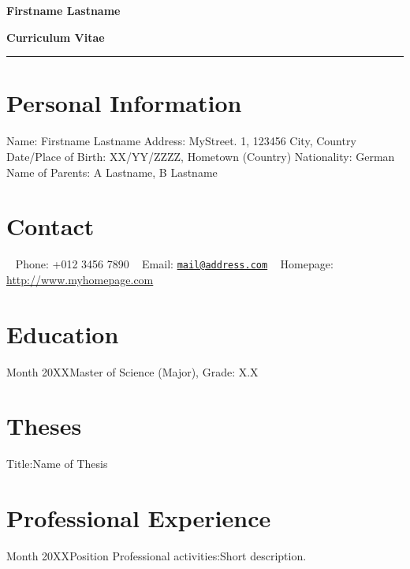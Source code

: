 \documentclass{tiny_cv}
\def\firstname{Firstname }
\def\familyname{Lastname}
\begin{document}
\begin{center}
\fontsize{30}{40}\selectfont \textbf{\firstname \familyname}
\end{center}

\begin{center}
\LARGE \textbf{Curriculum Vitae}
\end{center}


\noindent\rule{\textwidth}{1.2pt}

\section{Personal Information}
\identifyinginformationsubsection
{Name: \firstname \familyname}
{Address: MyStreet. 1, 123456 City, Country}
{Date/Place of Birth: XX/YY/ZZZZ, Hometown (Country)}
{Nationality: German}
{Name of Parents: A \familyname, B \familyname}

\section{Contact}
\contactinformationsubsection
{\Telefon~ Phone: +012 3456 7890}
{\Letter~ Email: \href{mailto:mail@address.com}{\nolinkurl{mail@address.com}}}
{\Mundus~ Homepage: \url{http://www.myhomepage.com}}

\section{Education}

                   {Month 20XX}{Master of Science (Major), Grade: X.X}

\section{Theses}
{Title:}{Name of Thesis}

\section{Professional Experience}

{Month 20XX}{Position}
{Professional activities:}{Short description.}
\end{document}
